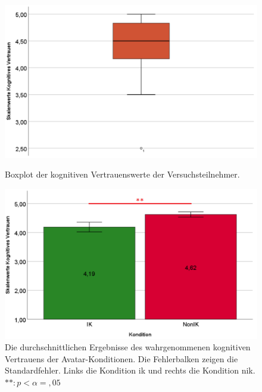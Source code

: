 \documentclass[a4paper,11pt]{article}%
\renewcommand{\\}{\vspace*{0.5\baselineskip} \newline}
\begin{document}
{	\begin{figure}[H]
   \begin{minipage}[t]{.5\linewidth} %
      \includegraphics[width=\linewidth]{Abbildungen/AuswertungDiagramme/Final/BP_kognitivesVertrauen.png}
      \caption[Boxplot der kognitiven Vertrauenswerte der Versuchsteilnehmer]{Boxplot der kognitiven Vertrauenswerte der Versuchsteilnehmer.}
            \label{SD_kognitivesVertrauenBP}
   \end{minipage}
   \hspace{.02\linewidth}%
   \begin{minipage}[t]{.5\linewidth} %
     \includegraphics[width=\linewidth]{Abbildungen/AuswertungDiagramme/Final/H1_Mittelwerte.png}
      \caption[Mittelwerte und der Standardfehler der kognitiven Vertrauenswerte]{Die durchschnittlichen Ergebnisse des wahrgenommenen kognitiven Vertrauens der Avatar-Konditionen. Die Fehlerbalken zeigen die Standardfehler. Links die Kondition \ac{ik} und rechts die Kondition \ac{nik}. $** : p < \alpha =,05$}
       \label{H1_Mittelwerte_Auswertung}
   \end{minipage}
\end{figure}

}
\end{document}
